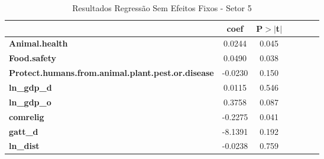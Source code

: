 \begin{table}[ht]
    \begin{center}
        \begin{tabular}{lcccccc}
            & \textbf{coef} & \textbf{P$> |$t$|$} \\
            \midrule
\textbf{Animal.health}                                    &       0.0244 &         0.045\\
\textbf{Food.safety}                                      &       0.0490 &         0.038\\
\textbf{Protect.humans.from.animal.plant.pest.or.disease} &      -0.0230 &         0.150\\
\textbf{ln\_gdp\_d}                                       &       0.0115 &         0.546\\
\textbf{ln\_gdp\_o}                                       &       0.3758 &         0.087\\
\textbf{comrelig}                                         &      -0.2275 &         0.041\\
\textbf{gatt\_d}                                          &      -8.1391 &         0.192\\
\textbf{ln\_dist}                                         &      -0.0238 &         0.759\\
\bottomrule
\end{tabular}
\caption{Resultados Regressão Sem Efeitos Fixos - Setor 5}
\end{center}
\end{table}